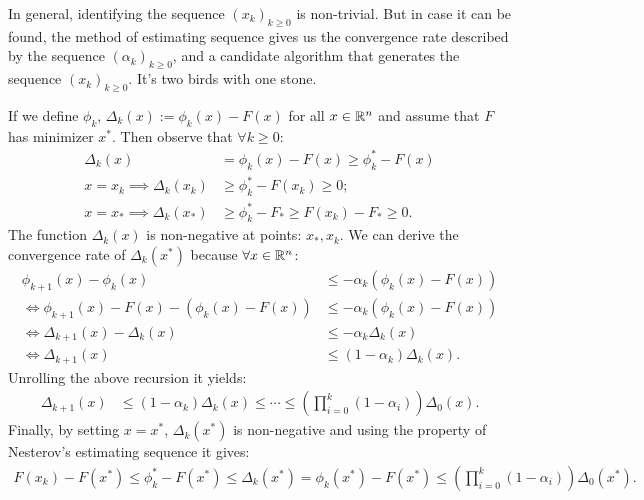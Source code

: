 \documentclass[12pt]{article}
\begin{document}
        \begin{observation}
            In general, identifying the sequence $(x_k)_{k \ge 0}$ is non-trivial. 
            But in case it can be found, the method of estimating sequence gives us the convergence rate described by the sequence $(\alpha_k)_{k \ge 0}$, and a candidate algorithm that generates the sequence $(x_k)_{k \ge 0}$. 
            It's two birds with one stone. 
            \par 
            If we define $\phi_k$, $\Delta_k(x) := \phi_k (x) - F(x)$ for all $x \in \mathbb R^n$ and assume that $F$ has minimizer $x^*$. 
            Then observe that $\forall k \ge 0$:  
            \begin{align*}
                \Delta_k(x) 
                &= \phi_k(x) - F(x) \ge \phi_k^* - F(x)
                \\
                x = x_k\implies 
                \Delta_k(x_k) 
                &\ge 
                \phi_k^* - F(x_k) \ge 0;
                \\
                x = x_* \implies 
                \Delta_k(x_*)
                &\ge \phi_k^* - F_* \ge F(x_k) - F_* \ge 0. 
            \end{align*}
            The function $\Delta_k(x)$ is non-negative at points: $x_*, x_k$.
            We can derive the convergence rate of $\Delta_k(x^*)$ because $\forall x \in \mathbb R^n$: 
            \begin{align*}
                \phi_{k + 1}(x) - \phi_k(x) 
                &\le - \alpha_k (\phi_k(x) - F(x))
                \\
                \iff 
                \phi_{k + 1}(x) - F(x) - (\phi_k(x) - F(x))
                &\le 
                -\alpha_k(\phi_k(x) - F(x))
                \\
                \iff
                \Delta_{k + 1}(x) - \Delta_k(x) &\le
                - \alpha_k\Delta_k(x)
                \\
                \iff 
                \Delta_{k + 1}(x) 
                &\le 
                (1 - \alpha_k)\Delta_k(x). 
            \end{align*}
            Unrolling the above recursion it yields: 
            \begin{align*}
                \Delta_{k + 1}(x) &\le 
                (1 - \alpha_k)\Delta_k(x) \le \cdots \le 
                \left(
                    \prod_{i = 0}^k(1 - \alpha_i)
                \right)\Delta_0(x). 
            \end{align*}
            Finally, by setting $x = x^*$, $\Delta_k(x^*)$ is non-negative and using the property of Nesterov's estimating sequence it gives: 
            \begin{align*}
                F(x_k) - F(x^*) \le \phi_k^* - F(x^*) \le \Delta_k(x^*) = \phi_k(x^*) - F(x^*) \le \left(\prod_{i = 0}^k(1 - \alpha_i)\right)\Delta_0(x^*).
            \end{align*} 

        \end{observation}
        
\end{document}

